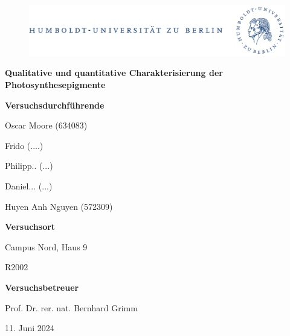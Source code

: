 \documentclass[10pt,a4paper]{article}
\begin{document}
	
	\begin{titlepage}
		\begin{center}
			\begin{figure}[h!tbp]
				\includegraphics[width=\linewidth]{HUlogo.PNG}
			\end{figure}
			\vspace*{2 cm}
			
			\textcolor{Bluetitle}{\textbf{\huge Qualitative und quantitative Charakterisierung
					der Photosynthesepigmente}}\par
			
			\vspace*{2cm}
			
			\textcolor{Greyish}{\textbf{Versuchsdurchführende}}\par
			\textcolor{Greyish}{Oscar Moore (634083)}\par
			\textcolor{Greyish}{Frido (....)}\par
			\textcolor{Greyish}{Philipp.. (...)}\par
			\textcolor{Greyish}{Daniel... (...)}\par
			\textcolor{Greyish}{Huyen Anh Nguyen (572309)}\par
			\vspace*{0.5cm}
			\textcolor{Greyish}{\textbf{Versuchsort}}\par
			\textcolor{Greyish}{Campus Nord, Haus 9}\par
			\textcolor{Greyish}{R2002}\par
			\vspace*{0.5cm}
			\textcolor{Greyish}{\textbf{Versuchsbetreuer}}\par
			\textcolor{Greyish}{Prof. Dr. rer. nat. Bernhard Grimm}\par
			
			\vspace*{2 cm}
			
			\textcolor{Greyish}{11. Juni 2024}\par
			

			
			
		\end{center}
	\end{titlepage}
		
		\tableofcontents
		
\end{document}
